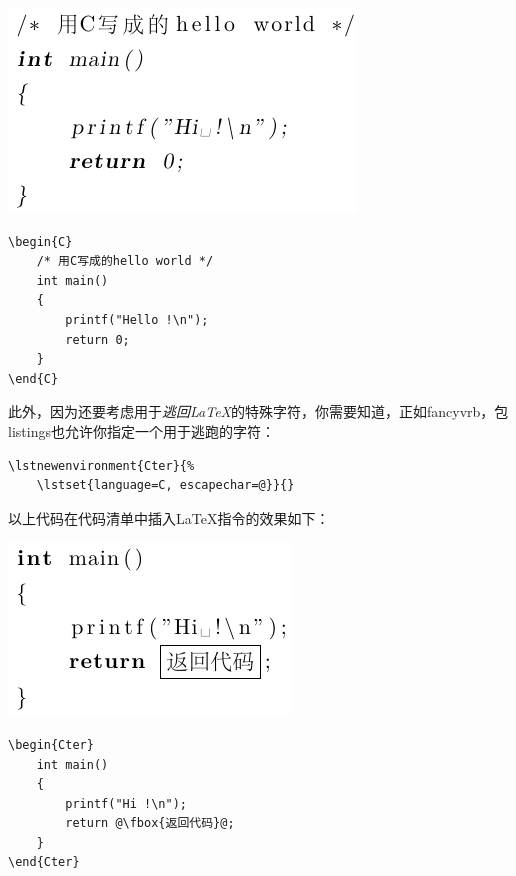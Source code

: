 \begin{codelist}[10.8]{
    \includegraphics{texs/chelloworld2}
}\begin{verbatim}
\begin{C}
    /* 用C写成的hello world */
    int main()
    {
        printf("Hello !\n");
        return 0;
    }
\end{C}
\end{verbatim}
\end{codelist}

此外，因为还要考虑用于\emph{逃回\LaTeX }的特殊字符，你需要知道，正如\textsf{fancyvrb}，包\textsf{listings}也允许你指定一个用于逃跑的字符：

\begin{dmd}
\begin{verbatim}
\lstnewenvironment{Cter}{% 
    \lstset{language=C, escapechar=@}}{}
\end{verbatim}
\end{dmd}

以上代码在代码清单中插入\LaTeX 指令的效果如下：

\begin{codelist}[10.9]{
    \includegraphics{texs/chelloworld3}
}\begin{verbatim}
\begin{Cter}
    int main()
    {
        printf("Hi !\n");
        return @\fbox{返回代码}@;
    } 
\end{Cter}
\end{verbatim}
\end{codelist}

